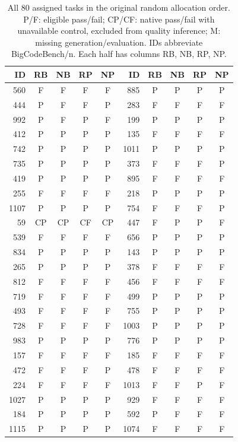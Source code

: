 \begin{table}[htbp]\centering\scriptsize
\caption{All 80 assigned tasks in the original random allocation order. P/F: eligible pass/fail; CP/CF: native pass/fail with unavailable control, excluded from quality inference; M: missing generation/evaluation. IDs abbreviate BigCodeBench/n. Each half has columns RB, NB, RP, NP.}\label{tab:seg80-all}
\begin{tabular*}{\linewidth}{@{\extracolsep{\fill}}rccccrcccc}\toprule
ID & RB & NB & RP & NP & ID & RB & NB & RP & NP\\\midrule
560 & F & F & F & F & 885 & P & P & P & P\\
444 & P & F & F & P & 283 & F & F & F & F\\
992 & P & F & P & F & 199 & P & P & P & P\\
412 & P & P & P & P & 135 & F & F & F & F\\
742 & P & P & P & P & 1011 & P & P & P & P\\
735 & P & P & P & P & 373 & F & F & F & P\\
419 & P & P & P & P & 895 & F & F & F & F\\
255 & F & F & F & F & 218 & P & P & P & P\\
1107 & P & P & P & P & 754 & F & F & F & P\\
59 & CP & CP & CF & CP & 447 & F & P & P & F\\
539 & F & F & F & F & 656 & P & P & P & P\\
834 & P & P & P & P & 143 & P & P & P & P\\
265 & P & P & P & P & 378 & F & F & F & F\\
812 & F & F & F & F & 456 & F & F & F & F\\
719 & F & F & F & F & 499 & P & P & P & P\\
493 & F & F & F & F & 755 & P & P & P & P\\
728 & F & F & F & F & 1003 & P & P & P & P\\
983 & P & P & P & P & 776 & P & P & P & P\\
157 & F & F & F & F & 185 & F & F & F & F\\
472 & F & F & F & P & 478 & F & F & F & F\\
224 & F & F & F & F & 1013 & F & F & P & F\\
1027 & P & P & P & P & 929 & F & F & F & F\\
184 & P & P & P & P & 592 & P & F & F & F\\
1115 & P & P & P & P & 1074 & F & F & F & F\\

\end{tabular*}
\end{table}
